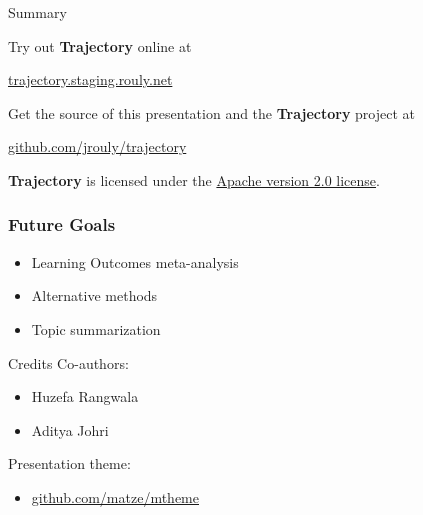 \documentclass[10pt, compress]{beamer}
\begin{document}


\begin{frame}{Summary}

  Try out \textbf{Trajectory} online at

  \begin{center}\url{trajectory.staging.rouly.net}\end{center}

  Get the source of this presentation and the \textbf{Trajectory} project
  at

  \begin{center}\url{github.com/jrouly/trajectory}\end{center}

  \vfill

  \textbf{Trajectory} is licensed under the
  \href{http://www.apache.org/licenses/LICENSE-2.0}{Apache version 2.0
  license}.

\end{frame}


\begin{frame}
  \frametitle{Future Goals}
  \begin{itemize}
    \item Learning Outcomes meta-analysis
    \item Alternative methods
    \item Topic summarization
  \end{itemize}
\end{frame}



\begin{frame}{Credits}
  Co-authors:
  \begin{itemize}
    \item Huzefa Rangwala
    \item Aditya Johri
  \end{itemize}

  Presentation theme:
  \begin{itemize}\item\url{github.com/matze/mtheme}\end{itemize}
\end{frame}


\end{document}

